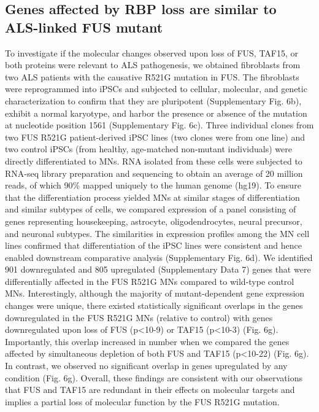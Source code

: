 \subsection{Genes affected by RBP loss are similar to ALS-linked FUS mutant}
To investigate if the molecular changes observed upon loss of FUS, TAF15, or both proteins were relevant to ALS pathogenesis, we obtained fibroblasts from two ALS patients with the causative R521G mutation in FUS. The fibroblasts were reprogrammed into iPSCs and subjected to cellular, molecular, and genetic characterization to confirm that they are pluripotent (Supplementary Fig. 6b), exhibit a normal karyotype, and harbor the presence or absence of the mutation at nucleotide position 1561 (Supplementary Fig. 6c). Three individual clones from two FUS R521G patient-derived iPSC lines (two clones were from one line) and two control iPSCs (from healthy, age-matched non-mutant individuals) were directly differentiated to MNs. RNA isolated from these cells were subjected to RNA-seq library preparation and sequencing to obtain an average of 20 million reads, of which 90\% mapped uniquely to the human genome (hg19). To ensure that the differentiation process yielded MNs at similar stages of differentiation and similar subtypes of cells, we compared expression of a panel consisting of genes representing housekeeping, astrocyte, oligodendrocytes, neural precursor, and neuronal subtypes. The similarities in expression profiles among the MN cell lines confirmed that differentiation of the iPSC lines were consistent and hence enabled downstream comparative analysis (Supplementary Fig. 6d). We identified 901 downregulated and 805 upregulated (Supplementary Data 7) genes that were differentially affected in the FUS R521G MNs compared to wild-type control MNs. Interestingly, although the majority of mutant-dependent gene expression changes were unique, there existed statistically significant overlaps in the genes downregulated in the FUS R521G MNs (relative to control) with genes downregulated upon loss of FUS (p<10-9) or TAF15 (p<10-3)  (Fig. 6g). Importantly, this overlap increased in number when we compared the genes affected by simultaneous depletion of both FUS and TAF15 (p<10-22) (Fig. 6g). In contrast, we observed no significant overlap in genes upregulated by any condition (Fig. 6g). Overall, these findings are consistent with our observations that FUS and TAF15 are redundant in their effects on molecular targets and implies a partial loss of molecular function by the FUS R521G mutation.

